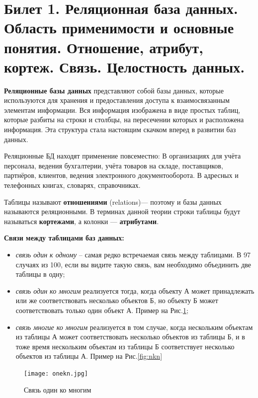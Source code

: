 \newpage
\section{Билет 1. Реляционная база данных. Область применимости и основные понятия. Отношение, атрибут, кортеж. Связь. Целостность данных.}

\textbf{Реляционные базы данных} представляют собой базы данных, которые используются для хранения и предоставления доступа к взаимосвязанным элементам информации. Вся информация изображена в виде простых таблиц, которые разбиты на строки и столбцы, на пересечении которых и расположена информация. Эта структура стала настоящим скачком вперед в развитии баз данных.

Реляционные БД находят применение повсеместно: В организациях для учёта персонала, ведения бухгалтерии, учёта товаров на складе, поставщиков, партнёров, клиентов, ведения электронного документооборота. В адресных и телефонных книгах, словарях, справочниках.

Таблицы называют \textbf{отношениями} (relations)— поэтому и базы данных называются реляционными. В терминах данной теории строки таблицы будут называться \textbf{кортежами}, а колонки — \textbf{атрибутами}.

\textbf{Связи между таблицами баз данных:}
\begin{itemize}
    \item \textit{связь один к одному} – самая редко встречаемая связь между таблицами. В 97 случаях из 100, если вы видите такую связь, вам необходимо объединить две таблицы в одну;
    \item \textit{связь один ко многим} реализуется тогда, когда объекту А может принадлежать или же соответствовать несколько объектов Б, но объекту Б может соответствовать только один объект А. Пример на Рис.\ref{fig:onekn};
    \item \textit{связь многие ко многим} реализуется в том случае, когда нескольким объектам из таблицы А может соответствовать несколько объектов из таблицы Б, и в тоже время нескольким объектам из таблицы Б соответствует несколько объектов из таблицы А. Пример на Рис.\ref{fig:nkn}
\end{itemize}

\begin{figure}[!h]
    \centering
    \texttt{[image: onekn.jpg]}
    \label{fig:onekn}
    \caption{Связь один ко многим}
\end{figure}

